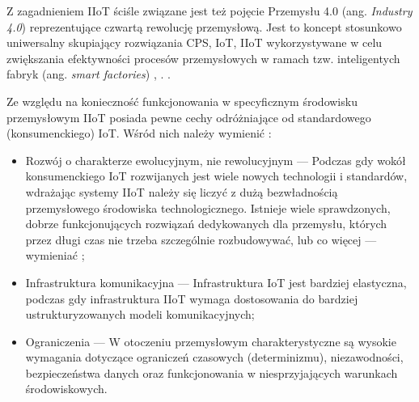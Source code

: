 \documentclass[a4paper, 12pt, twoside]{article}
\begin{document}
Z zagadnieniem IIoT ściśle związane jest też pojęcie Przemysłu 4.0 (ang. \emph{Industry 4.0})
reprezentujące czwartą rewolucję przemysłową. Jest to koncept stosunkowo uniwersalny
skupiający rozwiązania CPS, IoT, IIoT wykorzystywane w celu zwiększania efektywności
procesów przemysłowych w ramach tzw. inteligentych fabryk (ang. \emph{smart factories})
\cite{iiot-cyber-manufacturing-systems}, \cite{iiot-challenges-opportunities-directions}.
.

Ze względu na konieczność funkcjonowania w specyficznym środowisku przemysłowym
IIoT posiada pewne cechy odróżniające od standardowego (konsumenckiego) IoT.
Wśród nich należy wymienić \cite{iiot-challenges-opportunities-directions}:
\begin{itemize}
    \item Rozwój o charakterze ewolucyjnym, nie rewolucyjnym
    --- Podczas gdy wokół konsumenckiego IoT rozwijanych jest wiele nowych technologii i standardów, 
    wdrażając systemy IIoT należy się liczyć z dużą bezwładnością
    przemysłowego środowiska technologicznego. Istnieje wiele sprawdzonych, dobrze
    funkcjonujących rozwiązań dedykowanych dla przemysłu, których przez długi czas
    nie trzeba szczególnie rozbudowywać, lub co więcej --- wymieniać \cite{isp};
    \item Infrastruktura komunikacyjna 
    --- Infrastruktura IoT jest bardziej elastyczna, podczas gdy infrastruktura
    IIoT wymaga dostosowania do bardziej ustrukturyzowanych modeli komunikacyjnych;
    \item Ograniczenia
    --- W otoczeniu przemysłowym charakterystyczne są wysokie wymagania dotyczące
    ograniczeń czasowych (determinizmu), niezawodności, bezpieczeństwa danych oraz
    funkcjonowania w niesprzyjających warunkach środowiskowych.
\end{itemize}
\end{document}
